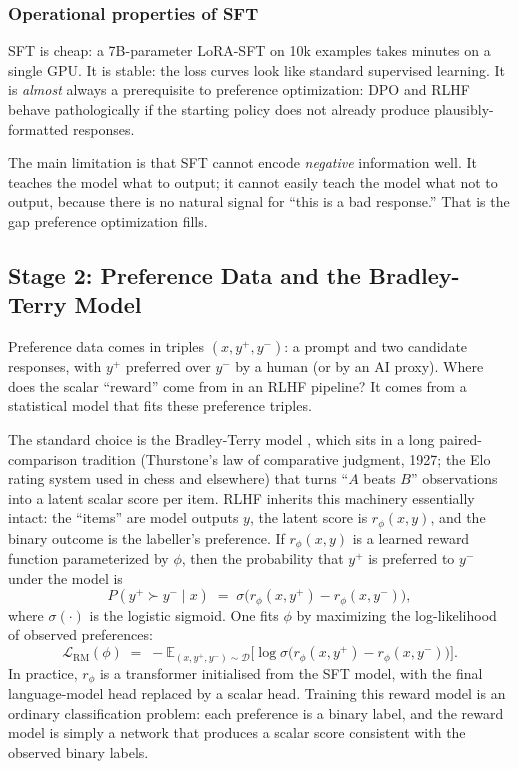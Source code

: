 \subsubsection{Operational properties of SFT}

SFT is cheap: a 7B-parameter LoRA-SFT on 10k examples takes minutes
on a single GPU. It is stable: the loss curves look like standard
supervised learning. It is \emph{almost} always a prerequisite to
preference optimization: DPO and RLHF behave pathologically if the
starting policy does not already produce plausibly-formatted
responses.

The main limitation is that SFT cannot encode \emph{negative}
information well. It teaches the model what to output; it cannot
easily teach the model what not to output, because there is no
natural signal for ``this is a bad response.'' That is the gap
preference optimization fills.

\subsection{Stage 2: Preference Data and the Bradley-Terry Model}

Preference data comes in triples $(x, y^+, y^-)$: a prompt and two
candidate responses, with $y^+$ preferred over $y^-$ by a human (or
by an AI proxy). Where does the scalar ``reward'' come from in an
RLHF pipeline? It comes from a statistical model that fits these
preference triples.

The standard choice is the Bradley-Terry model
\citep{bradley1952rank}, which sits in a long paired-comparison
tradition (Thurstone's law of comparative judgment, 1927; the
Elo rating system used in chess and elsewhere) that turns
``$A$ beats $B$'' observations into a latent scalar score per
item. RLHF inherits this machinery essentially intact: the
``items'' are model outputs $y$, the latent score is $r_\phi(x,y)$,
and the binary outcome is the labeller's preference. If
$r_\phi(x, y)$ is a learned reward function parameterized by
$\phi$, then the probability that $y^+$ is preferred to $y^-$
under the model is
\begin{equation}
  P(y^+ \succ y^- \mid x)
  \;=\;
  \sigma\big(r_\phi(x, y^+) - r_\phi(x, y^-)\big),
  \label{eq:bt}
\end{equation}
where $\sigma(\cdot)$ is the logistic sigmoid. One fits $\phi$ by
maximizing the log-likelihood of observed preferences:
\begin{equation}
  \mathcal{L}_\text{RM}(\phi)
  \;=\;
  -\mathbb{E}_{(x, y^+, y^-) \sim \mathcal{D}}
  \Big[
    \log \sigma\big(r_\phi(x, y^+) - r_\phi(x, y^-)\big)
  \Big].
  \label{eq:rm-loss}
\end{equation}
In practice, $r_\phi$ is a transformer initialised from the SFT
model, with the final language-model head replaced by a scalar
head. Training this reward model is an ordinary classification
problem: each preference is a binary label, and the reward model
is simply a network that produces a scalar score consistent with
the observed binary labels.

